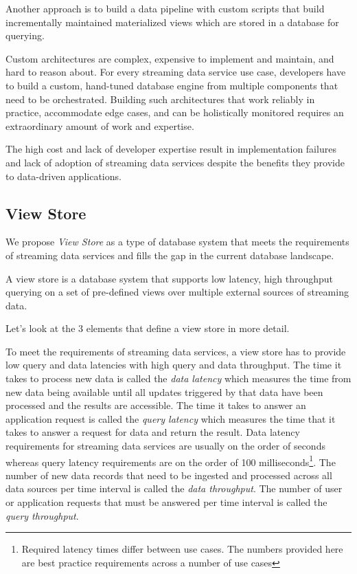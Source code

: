 \documentclass[	DIV=calc,%
							paper=letter,%
							fontsize=11pt,%
							twocolumn]{scrartcl}	 					%
\begin{document}
Another approach is to build a data pipeline with custom scripts that build incrementally maintained materialized views which are stored in a database for querying.

Custom architectures are complex, expensive to implement and maintain, and hard to reason about. For every streaming data service use case, developers have to build a custom, hand-tuned database engine from multiple components that need to be orchestrated. Building such architectures that work reliably in practice, accommodate edge cases, and can be holistically monitored requires an extraordinary amount of work and expertise.

The high cost and lack of developer expertise result in implementation failures and lack of adoption of streaming data services despite the benefits they provide to data-driven applications.

\subsection{View Store}
\label{sec:viewstoredef}

We propose \emph{View Store} as a type of database system that meets the requirements of streaming data services and fills the gap in the current database landscape.

A view store is a database system that supports low latency, high throughput querying on a set of pre-defined views over multiple external sources of streaming data.

Let's look at the 3 elements that define a view store in more detail.

To meet the requirements of streaming data services, a view store has to provide low query and data latencies with high query and data throughput.
The time it takes to process new data is called the \emph{data latency} which measures the time from new data being available until all updates triggered by that data have been processed and the results are accessible. The time it takes to answer an application request is called the \emph{query latency} which measures the time that it takes to answer a request for data and return the result. Data latency requirements for streaming data services are usually on the order of seconds whereas query latency requirements are on the order of 100 milliseconds\footnote{Required latency times differ between use cases. The numbers provided here are best practice requirements across a number of use cases}.
The number of new data records that need to be ingested and processed across all data sources per time interval is called the \emph{data throughput}. The number of user or application requests that must be answered per time interval is called the \emph{query throughput}.
\end{document}
